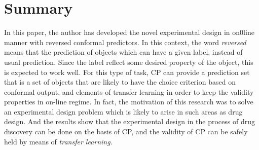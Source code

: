 \documentclass[10pt,a4paper]{article}
\begin{document}
\section{Summary}
In this paper, the author has developed the novel experimental design in on0line manner with reversed conformal predictors. In this context, the word \textit{reversed} means that the prediction of objects which can have a given label, instead of usual prediction. Since the label reflect some desired property of the object, this is expected to work well. For this type of task, CP can provide a prediction set that is a set of objects that are likely to have the choice criterion based on conformal output, and elements of transfer learning in order to keep the validity properties in on-line regime. In fact, the motivation of this research was to solve an experimental design problem which is likely to arise in such areas as drug design. And the results show that the experimental design in the process of drug discovery can be done on the basis of CP, and the validity of CP can be safely held by means of \textit{transfer learning}.

\medskip
 
\printbibliography
\end{document}
